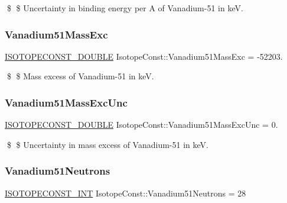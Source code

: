 \$ \$ Uncertainty in binding energy per A of Vanadium-\/51 in keV. \mbox{\label{group___isotope_const-_vanadium-_v51_ga1694d8c46357282601208a6f4d531b9e}} 
\subsubsection{\texorpdfstring{Vanadium51\+Mass\+Exc}{Vanadium51MassExc}}
{\footnotesize\ttfamily \mbox{\hyperlink{group___isotope_const-_macros_ga8f45a7272ce02c0b4c65c44636ed719a}{I\+S\+O\+T\+O\+P\+E\+C\+O\+N\+S\+T\+\_\+\+D\+O\+U\+B\+LE}} Isotope\+Const\+::\+Vanadium51\+Mass\+Exc = -\/52203.}

\$ \$ Mass excess of Vanadium-\/51 in keV. \mbox{\label{group___isotope_const-_vanadium-_v51_ga97cd13e901a417c61b196338488fe85a}} 
\subsubsection{\texorpdfstring{Vanadium51\+Mass\+Exc\+Unc}{Vanadium51MassExcUnc}}
{\footnotesize\ttfamily \mbox{\hyperlink{group___isotope_const-_macros_ga8f45a7272ce02c0b4c65c44636ed719a}{I\+S\+O\+T\+O\+P\+E\+C\+O\+N\+S\+T\+\_\+\+D\+O\+U\+B\+LE}} Isotope\+Const\+::\+Vanadium51\+Mass\+Exc\+Unc = 0.}

\$ \$ Uncertainty in mass excess of Vanadium-\/51 in keV. \mbox{\label{group___isotope_const-_vanadium-_v51_ga3dff29d5be99c6a0ad5411d26c0d4984}} 
\subsubsection{\texorpdfstring{Vanadium51\+Neutrons}{Vanadium51Neutrons}}
{\footnotesize\ttfamily \mbox{\hyperlink{group___isotope_const-_macros_ga5f18360b3e99483a35c32d789e62621c}{I\+S\+O\+T\+O\+P\+E\+C\+O\+N\+S\+T\+\_\+\+I\+NT}} Isotope\+Const\+::\+Vanadium51\+Neutrons = 28}

